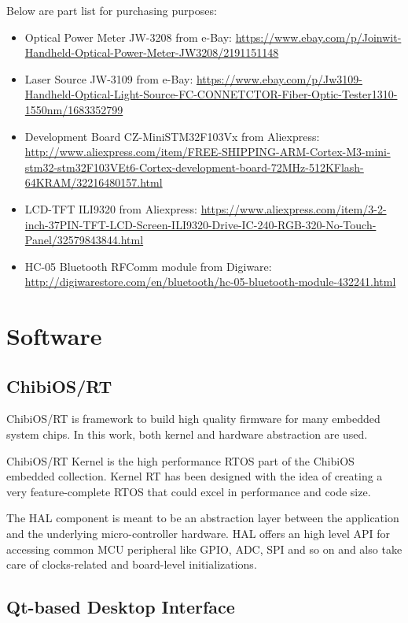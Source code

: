 \documentclass[12pt,]{book}
\begin{document}
	Below are part list for purchasing purposes:
	\begin{itemize}
		\item Optical Power Meter JW-3208 from e-Bay: \url{https://www.ebay.com/p/Joinwit-Handheld-Optical-Power-Meter-JW3208/2191151148}
		\item Laser Source JW-3109 from e-Bay: \url{https://www.ebay.com/p/Jw3109-Handheld-Optical-Light-Source-FC-CONNETCTOR-Fiber-Optic-Tester1310-1550nm/1683352799}
		\item Development Board CZ-MiniSTM32F103Vx from Aliexpress: \url{http://www.aliexpress.com/item/FREE-SHIPPING-ARM-Cortex-M3-mini-stm32-stm32F103VEt6-Cortex-development-board-72MHz-512KFlash-64KRAM/32216480157.html}
		\item LCD-TFT ILI9320 from Aliexpress: \url{https://www.aliexpress.com/item/3-2-inch-37PIN-TFT-LCD-Screen-ILI9320-Drive-IC-240-RGB-320-No-Touch-Panel/32579843844.html}
		\item HC-05 Bluetooth RFComm module from Digiware: \url{http://digiwarestore.com/en/bluetooth/hc-05-bluetooth-module-432241.html}
	\end{itemize}	  
	
	\section{Software}
	
	\subsection{ChibiOS/RT}
	ChibiOS/RT is framework to build high quality firmware for many embedded system chips.
	In this work, both kernel and hardware abstraction are used.
	
	ChibiOS/RT Kernel is the high performance RTOS part of the ChibiOS embedded collection.
	Kernel RT has been designed with the idea of creating a very feature-complete RTOS that could excel in performance and code size.
	
	The HAL component is meant to be an abstraction layer between the application and the underlying micro-controller hardware.
	HAL offers an high level API for accessing common MCU peripheral like GPIO, ADC, SPI and so on and also take care of clocks-related and board-level initializations.
	
	
	\subsection{Qt-based Desktop Interface}
	
\end{document}
